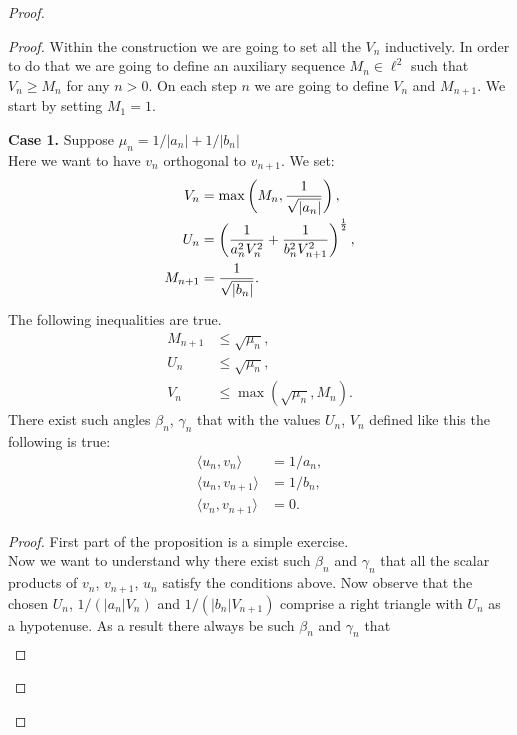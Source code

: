 \documentclass[12pt]{amsart}
\theoremstyle{case}
\begin{document}
\begin{proof}
\begin{proof}
        Within the construction we are going to set all the $V_n$ inductively.
        In order to do that we are going to define an auxiliary sequence $M_n \in \ell^2$ such that $V_n \geq M_n$ for any $n > 0$.
        On each step $n$ we are going to define $V_n$ and $M_{n+1}$.
        We start by setting $M_1 = 1$.

        \noindent\textbf{Case 1.} Suppose $\mu_n = 1/|a_n| + 1/|b_n|$\\
          Here we want to have $v_n$ orthogonal to $v_{n+1}$.
          We set:
          \begin{align*}
              V_n &= \max\left(M_n, \frac{1}{\sqrt{\smash[b]{|a_n|}}}\right),\\
              U_n &= \left(\frac{1}{a_n^2 V_n^2} + \frac{1}{b_n^2 V_{n+1}^2}\right)^\frac{1}{2},\\
              M_{n+1} &= \frac{1}{\sqrt{\smash[b]{|b_n|}}}.
          \end{align*}
          \begin{prop}
            The following inequalities are true.
            \begin{align*}
              M_{n+1} &\leq \sqrt{\mu_n},\\
              U_n &\leq \sqrt{\mu_n},\\
              V_n &\leq \max(\sqrt{\mu_n}, M_n).
            \end{align*}
            There exist such angles $\beta_n$, $\gamma_n$ that with the values $U_n$, $V_n$ defined like this the following is true:
            \begin{align*}
              \langle u_n, v_n \rangle &= 1/a_n,\\
              \langle u_n, v_{n+1} \rangle &= 1/b_n,\\
              \langle v_n, v_{n+1} \rangle &= 0.
            \end{align*}
          \end{prop}
          \begin{proof}
            First part of the proposition is a simple exercise.\\
            Now we want to understand why there exist such $\beta_n$ and $\gamma_n$ that all the scalar products of
            $v_n$, $v_{n+1}$, $u_n$ satisfy the conditions above.
            Now observe that the chosen $U_n$, $1/(|a_n| V_n)$ and $1/(|b_n| V_{n+1})$ 
            comprise a right triangle with $U_n$ as a hypotenuse.
            As a result there always be such $\beta_n$ and $\gamma_n$ that
            \begin{align*}

\end{align*}
\end{proof}
\end{proof}
\end{proof}
\end{document}
